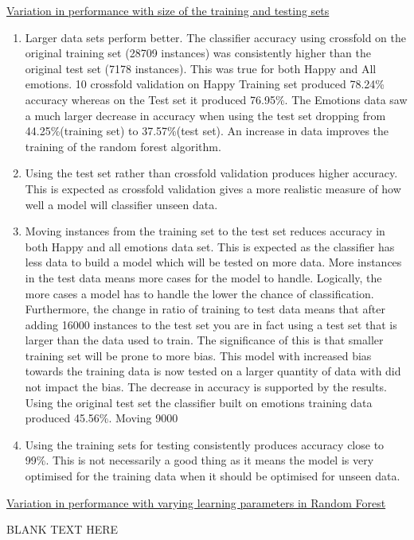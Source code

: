 \raggedright\underline{Variation in performance with size of the training and testing sets}

\begin{enumerate}
  \item Larger data sets perform better. The classifier accuracy using crossfold on the original training set (28709 instances) was consistently higher than the original test set (7178 instances). This was true for both Happy and All emotions. 10 crossfold validation on Happy Training set produced 78.24\% accuracy whereas on the Test set it produced 76.95\%. The Emotions data saw a much larger decrease in accuracy when using the test set dropping from 44.25\%(training set) to 37.57\%(test set). An increase in data improves the training of the random forest algorithm.
  \item Using the test set rather than crossfold validation produces higher accuracy. This is expected as crossfold validation gives a more realistic measure of how well a model will classifier unseen data.
  \item Moving instances from the training set to the test set reduces accuracy in both Happy and all emotions data set. This is expected as the classifier has less data to build a model which will be tested on more data. More instances in the test data means more cases for the model to handle. Logically, the more cases a model has to handle the lower the chance of classification. Furthermore, the change in ratio of training to test data means that after adding 16000 instances to the test set you are in fact using a test set that is larger than the data used to train. The significance of this is that smaller training set will be prone to more bias. This model with increased bias towards the training data is now tested on a larger quantity of data with did not impact the bias. The decrease in accuracy is supported by the results. Using the original test set the classifier built on emotions training data produced 45.56\%. Moving 9000
  
  
  \item Using the training sets for testing consistently produces accuracy close to 99\%. This is not necessarily a good thing as it means the model is very optimised for the training data when it should be optimised for unseen data.  
\end{enumerate}


\raggedright\underline{Variation in performance with varying learning parameters in Random Forest}

BLANK TEXT HERE
\newline

